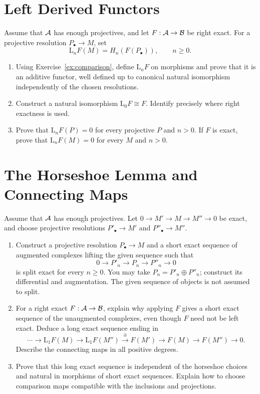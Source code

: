 \documentclass[11pt]{article}
\newcommand{\B}{\mathcal B}
\newcommand{\LF}{\mathrm L}
\begin{document}
\section{Left Derived Functors}\label{ex:left}
Assume that $\mathcal A$ has enough projectives, and let $F:\A\to\B$ be right exact.
For a projective resolution $P_\bullet\to M$, set
\[
\LF_nF(M)=H_n(F(P_\bullet)),\qquad n\geq0.
\]
\begin{enumerate}
\item Using Exercise~\ref{ex:comparison}, define $\LF_nF$ on morphisms and
prove that it is an additive functor, well defined up to canonical natural
isomorphism independently of the chosen resolutions.
\item Construct a natural isomorphism $\LF_0F\cong F$. Identify precisely
where right exactness is used.
\item Prove that $\LF_nF(P)=0$ for every projective $P$ and $n>0$.
If $F$ is exact, prove that $\LF_nF(M)=0$ for every $M$ and $n>0$.
\end{enumerate}


\section{The Horseshoe Lemma and Connecting Maps}\label{ex:horseshoe}
Assume that $\mathcal A$ has enough projectives. Let
$0\to M'\to M\to M''\to0$ be exact, and choose projective resolutions
$P'_\bullet\to M'$ and $P''_\bullet\to M''$.
\begin{enumerate}
\item Construct a projective resolution $P_\bullet\to M$ and a short exact
sequence of augmented complexes lifting the given sequence such that
\[
0\longrightarrow P'_n\longrightarrow P_n\longrightarrow P''_n
\longrightarrow0
\]
is split exact for every $n\geq0$. You may take $P_n=P'_n\oplus P''_n$;
construct its differential and augmentation. The given sequence of objects
is not assumed to split.
\item For a right exact $F:\A\to\B$, explain why applying $F$ gives a short
exact sequence of the unaugmented complexes, even though $F$ need not be
left exact. Deduce a long exact sequence ending in
\[
\cdots\to\LF_1F(M)\to\LF_1F(M'')\xrightarrow{\partial}
F(M')\to F(M)\to F(M'')\to0.
\]
Describe the connecting maps in all positive degrees.
\item Prove that this long exact sequence is independent of the horseshoe
choices and natural in morphisms of short exact sequences. Explain how to
choose comparison maps compatible with the inclusions and projections.
\end{enumerate}
\end{document}
